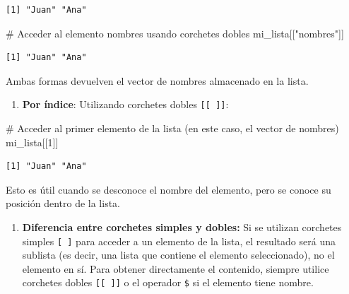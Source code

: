 \documentclass[
  spanish,
  a4paper,
  DIV=11,
  numbers=noendperiod,
  onepage,
  openany]{scrreprt}
\newenvironment{Shaded}{\begin{snugshade}}{\end{snugshade}}
\newcommand{\CommentTok}[1]{\textcolor[rgb]{0.37,0.37,0.37}{#1}}
\newcommand{\DecValTok}[1]{\textcolor[rgb]{0.68,0.00,0.00}{#1}}
\newcommand{\NormalTok}[1]{\textcolor[rgb]{0.00,0.23,0.31}{#1}}
\newcommand{\SpecialCharTok}[1]{\textcolor[rgb]{0.37,0.37,0.37}{#1}}
\newcommand{\StringTok}[1]{\textcolor[rgb]{0.13,0.47,0.30}{#1}}
\providecommand{\tightlist}{%
  \setlength{\itemsep}{0pt}\setlength{\parskip}{0pt}}
\begin{document}
\begin{Shaded}
\end{Shaded}

\begin{verbatim}
[1] "Juan" "Ana" 
\end{verbatim}

\begin{Shaded}
\begin{Highlighting}[]
\CommentTok{\# Acceder al elemento \textquotesingle{}nombres\textquotesingle{} usando corchetes dobles}
\NormalTok{mi\_lista[[}\StringTok{"nombres"}\NormalTok{]]}
\end{Highlighting}
\end{Shaded}

\begin{verbatim}
[1] "Juan" "Ana" 
\end{verbatim}

Ambas formas devuelven el vector de nombres almacenado en la lista.

\begin{enumerate}
\def\labelenumi{\arabic{enumi}.}
\setcounter{enumi}{1}
\tightlist
\item
  \textbf{Por índice}: Utilizando corchetes dobles
  \texttt{{[}{[}\ {]}{]}}:
\end{enumerate}

\begin{Shaded}
\begin{Highlighting}[]
\CommentTok{\# Acceder al primer elemento de la lista (en este caso, el vector de nombres)}
\NormalTok{mi\_lista[[}\DecValTok{1}\NormalTok{]]}
\end{Highlighting}
\end{Shaded}

\begin{verbatim}
[1] "Juan" "Ana" 
\end{verbatim}

Esto es útil cuando se desconoce el nombre del elemento, pero se conoce
su posición dentro de la lista.

\begin{enumerate}
\def\labelenumi{\arabic{enumi}.}
\setcounter{enumi}{2}
\tightlist
\item
  \textbf{Diferencia entre corchetes simples y dobles:} Si se utilizan
  corchetes simples \texttt{{[}\ {]}} para acceder a un elemento de la
  lista, el resultado será una sublista (es decir, una lista que
  contiene el elemento seleccionado), no el elemento en sí. Para obtener
  directamente el contenido, siempre utilice corchetes dobles
  \texttt{{[}{[}\ {]}{]}} o el operador \texttt{\$} si el elemento tiene
  nombre.
\end{enumerate}
\end{document}
